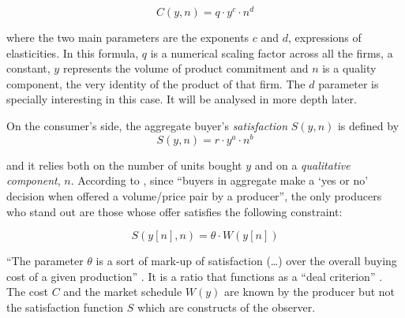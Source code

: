 \documentclass[a4paper, 12pt, openright, oneside, german, french, brazil, english, article]{abntex2}
\begin{document}
	\begin{equation}
	\label{cost}
		C(y, n) = q \cdot y^c \cdot n^d
	\end{equation}
	
	where the two main parameters are the exponents $c$ and $d$, expressions of elasticities. In this formula, $q$ is a numerical scaling factor across all the firms, a constant, $y$ represents the volume of product commitment and $n$ is a quality component, the very identity of the product of that firm. The $d$ parameter is specially interesting in this case. It will be analysed in more depth later.
	
	On the consumer's side, the aggregate buyer's \textit{satisfaction} $ S(y, n) $ is defined by 
	\begin{equation}
	\label{satisfaction}
		S(y, n) = r \cdot y^a \cdot n^b 	
	\end{equation}
		
	and it relies both on the number of units bought $y$ and on a \textit{qualitative component}, $n$. According to , since ``buyers in aggregate make a `yes or no' decision when offered a volume/price pair by a producer'', the only producers who stand out are those whose offer satisfies the following constraint:
	
	$$ S(y[n], n) = \theta \cdot W(y[n]) $$
	
	``The parameter $\theta$ is a sort of mark-up of satisfaction (\dots) over the overall buying cost of a given production'' \cite[p. 217]{favereau2002markets}. It is a ratio that functions as a ``deal criterion'' \cite[p. 39]{white2002markets}. The cost $C$ and the market schedule $W(y)$ are known by the producer but not the satisfaction function $S$ which are constructs of the observer.
	
	
	
\end{document}
